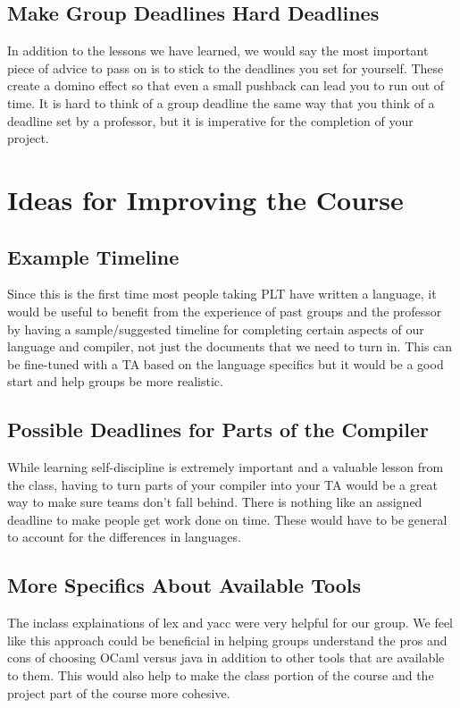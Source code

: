 \subsection{Make Group Deadlines Hard Deadlines}
In addition to the lessons we have learned, we would say the most important piece of advice to pass on is to stick to the deadlines you set for yourself. These create a domino effect so that even a small pushback can lead you to run out of time. It is hard to think of a group deadline the same way that you think of a deadline set by a professor, but it is imperative for the completion of your project.

\section{Ideas for Improving the Course}
\subsection{Example Timeline}
Since this is the first time most people taking PLT have written a language, it would be useful to benefit from the experience of past groups and the professor by having a sample/suggested timeline for completing certain aspects of our language and compiler, not just the documents that we need to turn in. This can be fine-tuned with a TA based on the language specifics but it would be a good start and help groups be more realistic.

\subsection{Possible Deadlines for Parts of the Compiler}
While learning self-discipline is extremely important and a valuable lesson from the class, having to turn parts of your compiler into your TA would be a great way to make sure teams don't fall behind. There is nothing like an assigned deadline to make people get work done on time. These would have to be general to account for the differences in languages.

\subsection{More Specifics About Available Tools}
The inclass explainations of lex and yacc were very helpful for our group. We feel like this approach could be beneficial in helping groups understand the pros and cons of choosing OCaml versus java in addition to other tools that are available to them. This would also help to make the class portion of the course and the project part of the course more cohesive.
